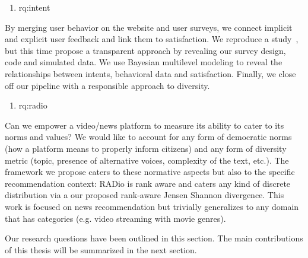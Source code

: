 %
%
\begin{enumerate}[label=\textbf{RQ\arabic*},ref={RQ\arabic*},resume,leftmargin=*]
	\item \acl{rq:intent}\label{rq:intent}
  \end{enumerate}
%
By merging user behavior on the website and user surveys, we connect implicit and explicit user feedback and link them to satisfaction. We reproduce a study~\cite{spotifyIntent}, but this time propose a transparent approach by revealing our survey design, code and simulated data. We use Bayesian multilevel modeling to reveal the relationships between intents, behavioral data and satisfaction. Finally, we close off our pipeline with a responsible approach to diversity.
%
%
\begin{enumerate}[label=\textbf{RQ\arabic*},ref={RQ\arabic*},resume,leftmargin=*]
	\item \acl{rq:radio}\label{rq:radio}
\end{enumerate}
%
Can we empower a video/news platform to measure its ability to cater to its norms and values? We would like to account for any form of democratic norms (how a platform means to properly inform citizens) and any form of diversity metric (topic, presence of alternative voices, complexity of the text, etc.). The framework we propose caters to these normative aspects but also to the specific recommendation context: RADio is rank aware and caters any kind of discrete distribution via a our proposed rank-aware Jensen Shannon divergence. This work is focused on news recommendation but trivially generalizes to any domain that has categories (e.g. video streaming with movie genres).

Our research questions have been outlined in this section. The main contributions of this thesis will be summarized in the next section.










